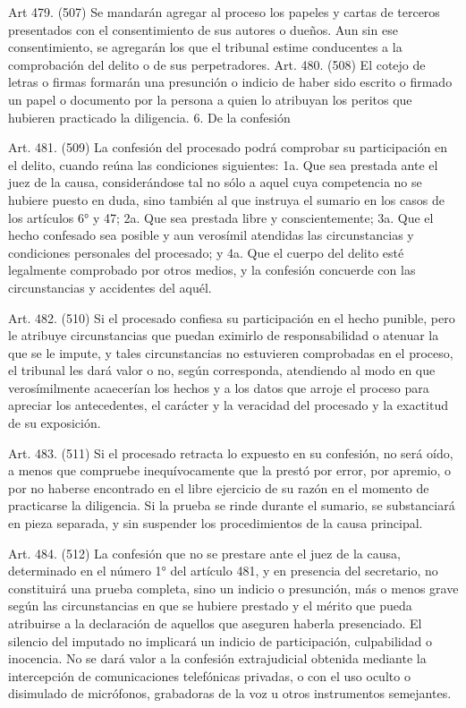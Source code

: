     Art 479. (507) Se mandarán agregar al proceso los papeles y cartas de terceros presentados con el consentimiento de sus autores o dueños.
    Aun sin ese consentimiento, se agregarán los que el tribunal estime conducentes a la comprobación del delito o de sus perpetradores.
    Art. 480. (508) El cotejo de letras o firmas formarán una presunción o indicio de haber sido escrito o firmado un papel o documento por la persona a quien lo atribuyan los peritos que hubieren practicado la diligencia.
  6. De la confesión

    Art. 481. (509) La confesión del procesado podrá comprobar su participación en el delito, cuando reúna las condiciones siguientes:
    1a. Que sea prestada ante el juez de la causa, considerándose tal no sólo a aquel cuya competencia no se hubiere puesto en duda, sino también al que instruya el sumario en los casos de los artículos 6° y 47;
    2a. Que sea prestada libre y conscientemente;
    3a. Que el hecho confesado sea posible y aun verosímil atendidas las circunstancias y condiciones personales del procesado; y
    4a. Que el cuerpo del delito esté legalmente comprobado por otros medios, y la confesión concuerde con las circunstancias y accidentes del aquél.


    Art. 482. (510) Si el procesado confiesa su participación en el hecho punible, pero le atribuye circunstancias que puedan eximirlo de responsabilidad o atenuar la que se le impute, y tales circunstancias no estuvieren comprobadas en el proceso, el tribunal les dará valor o no, según corresponda, atendiendo al modo en que verosímilmente acaecerían los hechos y a los datos que arroje el proceso para apreciar los antecedentes, el carácter y la veracidad del procesado y la exactitud de su exposición.

    Art. 483. (511) Si el procesado retracta lo expuesto en su confesión, no será oído, a menos que compruebe inequívocamente que la prestó por error, por apremio, o por no haberse encontrado en el libre ejercicio de su razón en el momento de practicarse la diligencia.
    Si la prueba se rinde durante el sumario, se substanciará en pieza separada, y sin suspender los procedimientos de la causa principal.


    Art. 484. (512) La confesión que no se prestare ante el juez de la causa, determinado en el número 1° del artículo 481, y en presencia del secretario, no constituirá una prueba completa, sino un indicio o presunción, más o menos grave según las circunstancias en que se hubiere prestado y el mérito que pueda atribuirse a la declaración de aquellos que aseguren haberla presenciado.
    El silencio del imputado no implicará un indicio de participación, culpabilidad o inocencia.
    No se dará valor a la confesión extrajudicial obtenida mediante la intercepción de comunicaciones telefónicas privadas, o con el uso oculto o disimulado de micrófonos, grabadoras de la voz u otros instrumentos semejantes.


